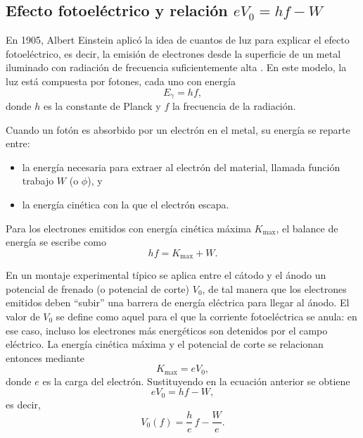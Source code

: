 \documentclass[11pt,twocolumn]{article}
\begin{document}
\subsection{Efecto fotoeléctrico y relación \texorpdfstring{$eV_0 = hf - W$}{eV₀ = hf - W}}

En 1905, Albert Einstein aplicó la idea de cuantos de luz para explicar
el efecto fotoeléctrico, es decir, la emisión de electrones desde la
superficie de un metal iluminado con radiación de frecuencia
suficientemente alta \cite{einstein1905_photoelectric}. En este modelo,
la luz está compuesta por fotones, cada uno con energía
\begin{equation*}
    E_{\gamma} = h f,
\end{equation*}
donde $h$ es la constante de Planck y $f$ la frecuencia de la radiación.

Cuando un fotón es absorbido por un electrón en el metal, su energía se
reparte entre:
\begin{itemize}
  \item la energía necesaria para extraer al electrón del material,
        llamada función trabajo $W$ (o $\phi$), y
  \item la energía cinética con la que el electrón escapa.
\end{itemize}
Para los electrones emitidos con energía cinética máxima $K_{\max}$, el
balance de energía se escribe como
\begin{equation*}
    h f = K_{\max} + W.
\end{equation*}

En un montaje experimental típico se aplica entre el cátodo y el ánodo
un potencial de frenado (o potencial de corte) $V_0$, de tal manera que
los electrones emitidos deben ``subir'' una barrera de energía eléctrica
para llegar al ánodo. El valor de $V_0$ se define como aquel para el que
la corriente fotoeléctrica se anula: en ese caso, incluso los electrones
más energéticos son detenidos por el campo eléctrico. La energía
cinética máxima y el potencial de corte se relacionan entonces mediante
\begin{equation*}
    K_{\max} = e V_0,
\end{equation*}
donde $e$ es la carga del electrón. Sustituyendo en la ecuación anterior
se obtiene
\begin{equation*}
    e V_0 = h f - W,
\end{equation*}
es decir,
\begin{equation*}
    V_0(f) = \frac{h}{e}\,f - \frac{W}{e}.
\end{equation*}
\end{document}
